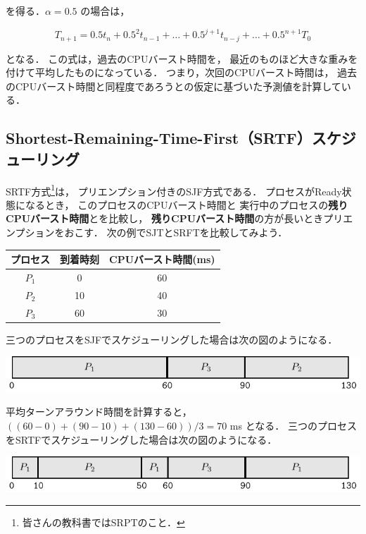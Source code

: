 を得る．$\alpha = 0.5$ の場合は，

\[T_{n+1} = 0.5 t_n + 0.5^2 t_{n-1} + \dots +
0.5^{j+1} t_{n-j} + \dots + 0.5^{n+1} T_0 \]

となる．
この式は，過去のCPUバースト時間を，
最近のものほど大きな重みを付けて平均したものになっている．
つまり，次回のCPUバースト時間は，
過去のCPUバースト時間と同程度であろうとの仮定に基づいた予測値を計算している．

\subsection{Shortest-Remaining-Time-First（SRTF）スケジューリング}
SRTF方式\footnote{皆さんの教科書ではSRPTのこと．}は，
プリエンプション付きのSJF方式である．
プロセスがReady状態になるとき，
このプロセスのCPUバースト時間と
実行中のプロセスの{\bf 残りCPUバースト時間}とを比較し，
{\bf 残りCPUバースト時間}の方が長いときプリエンプションをおこす．
次の例でSJTとSRFTを比較してみよう．

\begin{center}
\begin{tabular}{c c c}
プロセス & 到着時刻 & CPUバースト時間(ms) \\
\hline
$P_1$    & 0  & 60 \\
$P_2$    & 10 & 40 \\
$P_3$    & 60 & 30 \\
\end{tabular}
\end{center}

三つのプロセスをSJFでスケジューリングした場合は次の図のようになる．

\begin{center}
\includegraphics[scale=1.0]{GanntChart/sjf2.pdf}
\end{center}

平均ターンアラウンド時間を計算すると，
$((60-0)+(90-10)+(130-60))/3=70$ ms となる．
三つのプロセスをSRTFでスケジューリングした場合は次の図のようになる．

\begin{center}
\includegraphics[scale=1.0]{GanntChart/srtf1.pdf}
\end{center}

